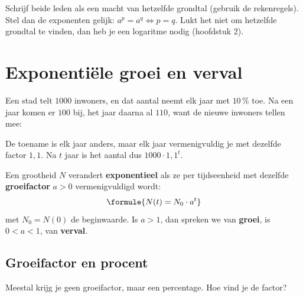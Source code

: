 \begin{werkwijze}
Schrijf beide leden als een macht van hetzelfde grondtal (gebruik de rekenregels). Stel dan de exponenten gelijk: $a^p = a^q \iff p = q$. Lukt het niet om hetzelfde grondtal te vinden, dan heb je een logaritme nodig (hoofdstuk 2).
\end{werkwijze}

\begin{oefeningen}

\end{oefeningen}

\section{Exponentiële groei en verval}

Een stad telt $1000$ inwoners, en dat aantal neemt elk jaar met $10$\,\% toe. Na een jaar komen er $100$ bij, het jaar daarna al $110$, want de nieuwe inwoners tellen mee:


De toename is elk jaar anders, maar elk jaar vermenigvuldig je met dezelfde factor $1{,}1$. Na $t$ jaar is het aantal dus $1000 \cdot 1{,}1^t$.

\begin{theorie}
Een grootheid $N$ verandert \textbf{\textcolor{accent}{exponentieel}} als ze per tijdseenheid met dezelfde \textbf{\textcolor{accent}{groeifactor}} $a > 0$ vermenigvuldigd wordt:
\[\formule{N(t) = N_0 \cdot a^t}\]
met $N_0 = N(0)$ de beginwaarde. Is $a > 1$, dan spreken we van \textbf{\textcolor{accent}{groei}}, is $0 < a < 1$, van \textbf{\textcolor{accent}{verval}}.
\end{theorie}

\subsection{Groeifactor en procent}

Meestal krijg je geen groeifactor, maar een percentage. Hoe vind je de factor?


